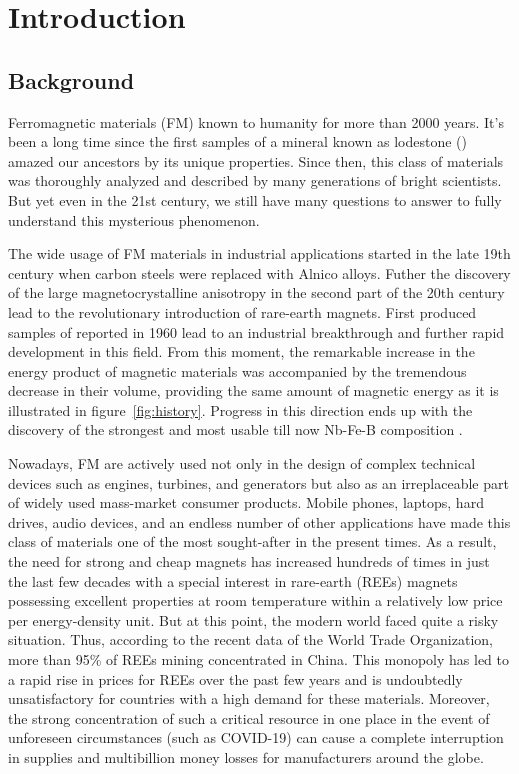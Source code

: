 \chapter{Introduction}

\section{Background}
Ferromagnetic materials (FM) known to humanity for more than 2000 years. It's been a long time since the first samples of a mineral known as lodestone () amazed our ancestors by its unique properties. Since then, this class of materials was thoroughly analyzed and described by many generations of bright scientists. But yet even in the 21st century, we still have many questions to answer to fully understand this mysterious phenomenon. 

The wide usage of FM materials in industrial applications started in the late 19th century when carbon steels were replaced with Alnico alloys.  Futher the discovery of the large magnetocrystalline anisotropy in the second part of the 20th century lead to the revolutionary introduction of rare-earth magnets. First produced samples of  reported in 1960 lead to an industrial breakthrough and further rapid development in this field.  From this moment, the remarkable increase in the energy product of magnetic materials was accompanied by the tremendous decrease in their volume, providing the same amount of magnetic energy as it is illustrated in figure~\ref{fig:history}.  Progress in this direction ends up with the discovery of the strongest and most usable till now Nb-Fe-B composition \cite{Gutfleisch2010}. 

Nowadays, FM are actively used not only in the design of complex technical devices such as engines, turbines, and generators but also as an irreplaceable part of widely used mass-market consumer products. Mobile phones, laptops, hard drives, audio devices, and an endless number of other applications have made this class of materials one of the most sought-after in the present times. As a result, the need for strong and cheap magnets has increased hundreds of times in just the last few decades with a special interest in rare-earth (REEs) magnets possessing excellent properties at room temperature within a relatively low price per energy-density unit.
But at this point, the modern world faced quite a risky situation. Thus, according to the recent data of the World Trade Organization, more than 95\% of REEs mining concentrated in China. This monopoly has led to a rapid rise in prices for REEs over the past few years and is undoubtedly unsatisfactory for countries with a high demand for these materials. Moreover, the strong concentration of such a critical resource in one place in the event of unforeseen circumstances (such as COVID-19) can cause a complete interruption in supplies and multibillion money losses for manufacturers around the globe.

